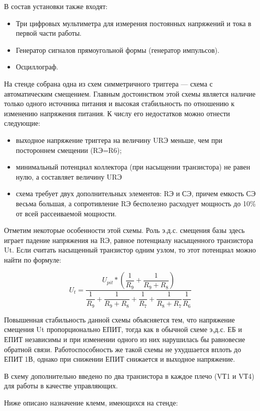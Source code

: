 \documentclass[a4paper,14pt]{article}
\begin{document}
В состав установки также входят:

\begin{itemize}
	\item Три цифровых мультиметра для измерения постоянных напряжений и тока в
	первой части работы.
	\item Генератор сигналов прямоугольной формы (генератор импульсов).
	\item Осциллограф.
\end{itemize}

На стенде собрана одна из схем симметричного триггера — схема с автоматическим
смещением. Главным достоинством этой схемы является наличие только одного источника
питания и высокая стабильность по отношению к изменению напряжения питания. К числу
его недостатков можно отнести следующие:

\begin{itemize}
	\item выходное напряжение триггера на величину URЭ меньше, чем при постороннем смещении
	(RЭ=R6);
	\item минимальный потенциал коллектора (при насыщении транзистора) не равен нулю, а
	составляет величину URЭ
	\item схема требует двух дополнительных элементов: RЭ и СЭ, причем емкость СЭ весьма
	большая, а сопротивление RЭ бесполезно расходует мощность до 10\% от всей рассеиваемой
	мощности.
\end{itemize}

Отметим некоторые особенности этой схемы. Роль э.д.с. смещения базы здесь играет
падение напряжения на RЭ, равное потенциалу насыщенного транзистора Ut. Если считать
насыщенный транзистор одним узлом, то этот потенциал можно найти по формуле:

$$U_t = \dfrac{U_{pit} * (\dfrac{1}{R_9} + \dfrac{1}{R_9 + R_8})}{\dfrac{1}{R_9} + \dfrac{1}{R_9 + R_8} + \dfrac{1}{R_7} + \dfrac{1}{R_8 + R_7} \dfrac{1}{R_6}}$$

Повышенная стабильность данной схемы объясняется тем, что напряжение смещения
Ut пропорционально ЕПИТ, тогда как в обычной схеме э,д.с. ЕБ и ЕПИТ независимы и при
изменении одного из них нарушилась бы равновесие обратной связи. Работоспособность же
такой схемы не ухудшается вплоть до ЕПИТ1В, однако при снижении ЕПИТ снижается и
выходное напряжение.

В схему дополнительно введено по два транзистора в каждое плечо (VТ1 и VТ4) для
работы в качестве управляющих.

Ниже описано назначение клемм, имеющихся на стенде:
\end{document}
